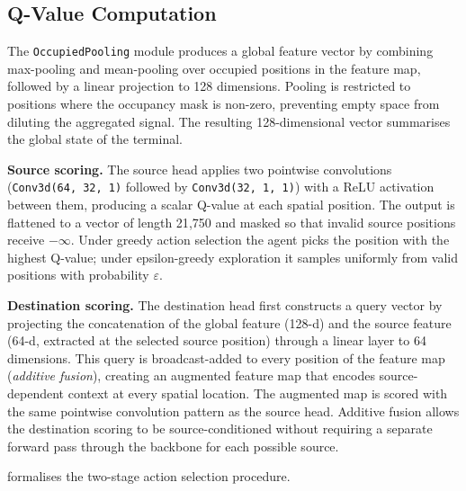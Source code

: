 \subsection{Q-Value Computation}
\label{sec:agent:unified:qvalue}

The \texttt{OccupiedPooling} module produces a global feature vector by combining max-pooling and mean-pooling over occupied positions in the feature map, followed by a linear projection to 128 dimensions. Pooling is restricted to positions where the occupancy mask is non-zero, preventing empty space from diluting the aggregated signal. The resulting 128-dimensional vector summarises the global state of the terminal.

\textbf{Source scoring.} The source head applies two pointwise convolutions (\texttt{Conv3d(64, 32, 1)} followed by \texttt{Conv3d(32, 1, 1)}) with a ReLU activation between them, producing a scalar Q-value at each spatial position. The output is flattened to a vector of length 21{,}750 and masked so that invalid source positions receive $-\infty$. Under greedy action selection the agent picks the position with the highest Q-value; under epsilon-greedy exploration it samples uniformly from valid positions with probability $\varepsilon$.

\textbf{Destination scoring.} The destination head first constructs a query vector by projecting the concatenation of the global feature (128-d) and the source feature (64-d, extracted at the selected source position) through a linear layer to 64 dimensions. This query is broadcast-added to every position of the feature map (\emph{additive fusion}), creating an augmented feature map that encodes source-dependent context at every spatial location. The augmented map is scored with the same pointwise convolution pattern as the source head. Additive fusion allows the destination scoring to be source-conditioned without requiring a separate forward pass through the backbone for each possible source.

 formalises the two-stage action selection procedure.

